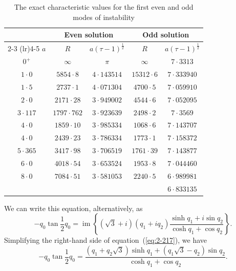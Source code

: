 \begin{table}[htbp]
\centering
\caption{The exact characteristic values for the first even and odd modes of instability}
\label{tab:2-I}
\medskip
\begin{tabular}{@{}c cc cc@{}}
\toprule
& \multicolumn{2}{c}{Even solution} & \multicolumn{2}{c}{Odd solution} \\
\cmidrule(lr){2-3} \cmidrule(lr){4-5}
$a$ & $R$ & $a(\tau-1)^{\frac{1}{2}}$ & $R$ & $a(\tau-1)^{\frac{1}{2}}$ \\
\midrule
$0^+$    & $\infty$  & $\pi$       & $\infty$  & $7{\cdot}3313$   \\
$1{\cdot}0$ & $5854{\cdot}8$ & $4{\cdot}143514$ & $15312{\cdot}6$ & $7{\cdot}333940$  \\
$1{\cdot}5$ & $2737{\cdot}1$ & $4{\cdot}071304$ & $4700{\cdot}5$ & $7{\cdot}059910$  \\
$2{\cdot}0$ & $2171{\cdot}28$ & $3{\cdot}949002$ & $4544{\cdot}6$ & $7{\cdot}052095$  \\
$3{\cdot}117$ & $1797{\cdot}762$ & $3{\cdot}923639$ & $2498{\cdot}2$ & $7{\cdot}3569$ \\
$4{\cdot}0$ & $1859{\cdot}10$ & $3{\cdot}985334$ & $1068{\cdot}6$ & $7{\cdot}143707$ \\
$4{\cdot}0$ & $2439{\cdot}23$ & $3{\cdot}786334$ & $1773{\cdot}1$ & $7{\cdot}158372$  \\
$5{\cdot}365$ & $3417{\cdot}98$ & $3{\cdot}706519$ & $1761{\cdot}39$ & $7{\cdot}143877$  \\
$6{\cdot}0$ & $4018{\cdot}54$ & $3{\cdot}653524$ & $1953{\cdot}8$ & $7{\cdot}044460$  \\
$8{\cdot}0$ & $7084{\cdot}51$ & $3{\cdot}581053$ & $2240{\cdot}5$ & $6{\cdot}989981$ \\
 & & & & $6{\cdot}833135$ \\
\bottomrule
\end{tabular}
\end{table}

We can write this equation, alternatively, as
\begin{equation}
\label{eq:2-217}
-q_0\tan\frac{1}{2}q_0 = \operatorname{im}\!\left\{(\sqrt{3}+i)(q_1+iq_2)\frac{\sinh q_1+i\sin q_2}{\cosh q_1+\cos q_2}\right\}\!.
\end{equation}
Simplifying the right-hand side of equation~(\ref{eq:2-217}), we have
\begin{equation}
\label{eq:2-218}
-q_0\tan\frac{1}{2}q_0 = \frac{(q_1+q_2\sqrt{3})\sinh q_1+(q_1\sqrt{3}-q_2)\sin q_2}{\cosh q_1+\cos q_2}.
\end{equation}

